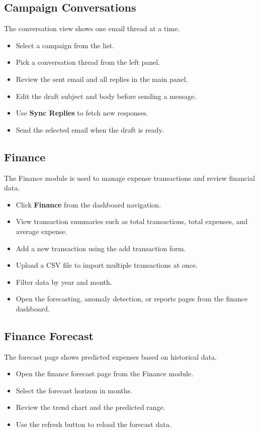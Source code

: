 \subsection{Campaign Conversations}
The conversation view shows one email thread at a time.
\begin{itemize}
    \item Select a campaign from the list.
    \item Pick a conversation thread from the left panel.
    \item Review the sent email and all replies in the main panel.
    \item Edit the draft subject and body before sending a message.
    \item Use \textbf{Sync Replies} to fetch new responses.
    \item Send the selected email when the draft is ready.
\end{itemize}

\subsection{Finance}
The Finance module is used to manage expense transactions and review financial data.
\begin{itemize}
    \item Click \textbf{Finance} from the dashboard navigation.
    \item View transaction summaries such as total transactions, total expenses, and average expense.
    \item Add a new transaction using the add transaction form.
    \item Upload a CSV file to import multiple transactions at once.
    \item Filter data by year and month.
    \item Open the forecasting, anomaly detection, or reports pages from the finance dashboard.
\end{itemize}

\subsection{Finance Forecast}
The forecast page shows predicted expenses based on historical data.
\begin{itemize}
    \item Open the finance forecast page from the Finance module.
    \item Select the forecast horizon in months.
    \item Review the trend chart and the predicted range.
    \item Use the refresh button to reload the forecast data.
\end{itemize}


